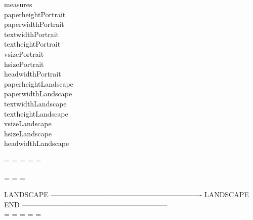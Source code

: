 \documentclass[a4paper]{article}
\newlength{\paperheightPortrait}
\newlength{\paperwidthPortrait}
\newlength{\textheightPortrait}
\newlength{\textwidthPortrait}
\newlength{\vsizePortrait}
\newlength{\hsizePortrait}
\newlength{\headwidthPortrait}
\newlength{\textheightLandscape}
\newlength{\textwidthLandscape}
\newlength{\paperheightLandscape}
\newlength{\paperwidthLandscape}
\newlength{\vsizeLandscape}
\newlength{\hsizeLandscape}
\newlength{\headwidthLandscape} %
\begin{document}
\layout
measures \\
paperheightPortrait	\the\paperheightPortrait \\
paperwidthPortrait	\the\paperwidthPortrait \\
textwidthPortrait	\the{} \\
textheightPortrait	\the\textheightPortrait \\
vsizePortrait	\the\vsizePortrait \\
hsizePortrait	\the\hsizePortrait  \\
headwidthPortrait	\the\headwidthPortrait \\
paperheightLandscape	\the\paperheightLandscape \\
paperwidthLandscape	\the\paperwidthLandscape \\
textwidthLandscape	\the{} \\
textheightLandscape	\the\textheightLandscape \\
vsizeLandscape	\the\vsizeLandscape \\
hsizeLandscape	\the\hsizeLandscape  \\
headwidthLandscape	\the\headwidthLandscape \\
\lipsum[1-10]


\newpage %
\headwidth=\headwidthLandscape
\pdfpageheight=\paperheightLandscape
\pdfpagewidth=\paperwidthLandscape
\paperwidth=\paperwidthLandscape
\paperheight=\paperheightLandscape
\newpage


\begingroup
\ClearWallPaper
{}

\textwidth=
\textheight=\textheightLandscape
\hsize=\hsizeLandscape

\newpage 
LANDSCAPE ----------------------------------------------------------------
\lipsum[1-22]
\endgroup
LANDSCAPE END --------------------------------------------------------------\\



\newpage
\headwidth=\headwidthPortrait
\pdfpageheight=\paperheightPortrait
\pdfpagewidth=\paperwidthPortrait
\paperwidth=\paperwidthPortrait
\paperheight=\paperheightPortrait

\ClearWallPaper
{}
\lipsum[1-15]
\newpage
\lipsum[1-10]
\end{document}

